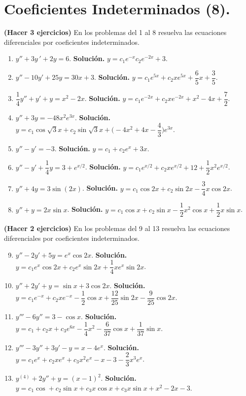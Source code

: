 \documentclass[letterpaper,10pt]{memoir}
\begin{document}
\titulo

\section*{Coeficientes Indeterminados (8).} %
\textbf{(Hacer 3 ejercicios)} En los problemas del 1 al 8 resuelva las ecuaciones diferenciales por coeficientes indeterminados.
\begin{enumerate}
	\item \(y'' +3y \,' +2y=6\). \textbf{Solución.} \(y=c_1e^{-x} c_2e^{-2x} +3\).
	\item \(y'' -10y' +25y=30x+3\). \textbf{Solución.} \(y=c_1e^{5x} +c_2xe^{5x} + \dfrac{6}{5} x+ \dfrac{3}{5}\).
	\item \(\dfrac{1}{4} y'' +y' +y=x^2-2x\). \textbf{Solución.} \(y=c_1e^{-2x} +c_2xe^{-2x} +x^2-4x+ \dfrac{7}{2}\). 
	\item \(y'' +3y=-48x^2e^{3x}\). \textbf{Solución.} \(y=c_1 \cos \sqrt{3} x+c_2 \sin \sqrt{3} x+ \Bigg(-4x^2+4x- \dfrac{4}{3}\Bigg) e^{3x}\).
	\item \(y'' -y' =-3\). \textbf{Solución.} \(y=c_1+c_2e^x+3x\).
	\item \(y'' -y' + \dfrac{1}{4} y=3+e^{x/2}\). \textbf{Solución.} \(y=c_1e^{x/2} +c_2xe^{x/2} +12+ \dfrac{1}{2} x^2e^{x/2}\).
	\item \(y'' +4y=3 \sin (2x)\). \textbf{Solución.} \(y=c_1 \cos 2x+c_2 \sin 2x- \dfrac{3}{4} x \cos 2x\).
	\item \(y'' +y=2 x \sin x\). \textbf{Solución.} \(y= c_1 \cos x+c_2 \sin x- \dfrac{1}{2} x^2 \cos x+ \dfrac{1}{2} x \sin x\).
\end{enumerate}
\textbf{(Hacer 2 ejercicios)} En los problemas del 9 al 13 resuelva las ecuaciones diferenciales por coeficientes indeterminados.
\begin{enumerate}
	\setcounter{enumi}{8}
	\item \(y'' -2y' +5y=e^x \cos 2x\). \textbf{Solución.} \(y=c_1e^x \cos 2x+c_2e^x \sin 2x+ \dfrac{1}{4} xe^x \sin 2x\).
	\item \(y'' +2y' +y= \sin x+3 \cos 2x\). \textbf{Solución.} \(y=c_1e^{-x} +c_2xe^{-x} - \dfrac{1}{2} \cos x+ \dfrac{12}{25} \sin 2x - \dfrac{9}{25} \cos 2x\).
	\item \(y''' -6y'' =3- \cos x\). \textbf{Solución.} \(y=c_1+c_2x+c_3e^{6x} - \dfrac{1}{4} x^2- \dfrac{6}{37} \cos x+ \dfrac{1}{37} \sin x\).
	\item \(y''' -3y'' +3y' -y=x-4e^x\). \textbf{Solución.} \(y=c_1e^x+c_2xe^x+c_3x^2e^x-x-3- \dfrac{2}{3} x^3e^x\).
	\item \(y^{(4)} +2y'' +y=(x-1) ^2\). \textbf{Solución.} \(y=c_1 \cos +c_2 \sin x +c_3x \cos x+c_3x \sin x+x^2-2x-3\).
\end{enumerate}
\end{document}
